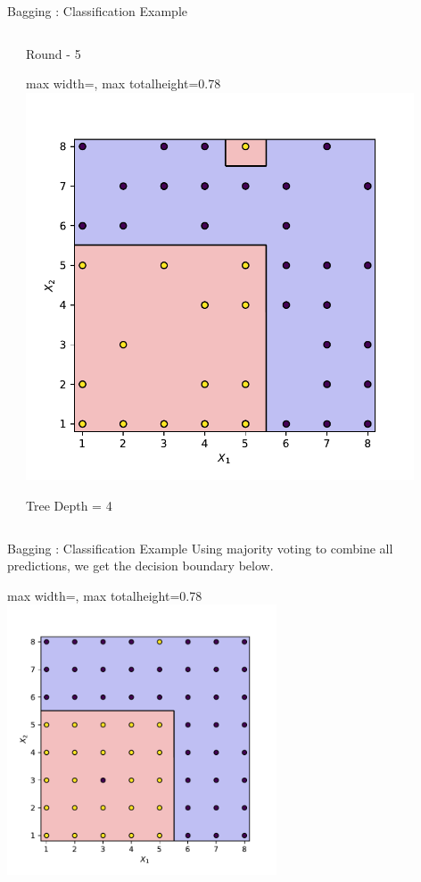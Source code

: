 \documentclass[10pt]{beamer}
\newcommand{\fitpic}[1]{\begin{adjustbox}{max width=\linewidth, max totalheight=0.78\textheight}#1\end{adjustbox}}
\begin{document}
\begin{frame}{Bagging : Classification Example}
\begin{columns}
\begin{column}{0.3\textwidth}
    \end{column}
    \pause  \begin{column}{0.3\textwidth}
      \centering
      Round - 5\\

      \fitpic{\includegraphics[width = 0.9\textwidth]{../assets/ensemble/figures/decision-boundary-4}}
      Tree Depth = 4

    \end{column}

  \end{columns}
\end{frame}

\begin{frame}{Bagging : Classification Example}
  Using majority voting to combine all predictions, we get the decision boundary below.\\
  \vspace{0.5cm}
  \centering
  \fitpic{\includegraphics[width = 0.6\textwidth]{../assets/ensemble/figures/decision-boundary-ensemble}}
\end{frame}
\end{document}
